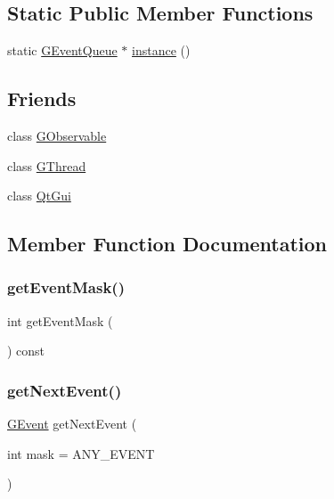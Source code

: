 \subsection*{Static Public Member Functions}
\begin{DoxyCompactItemize}
\item 
static \mbox{\hyperlink{classGEventQueue}{G\+Event\+Queue}} $\ast$ \mbox{\hyperlink{classGEventQueue_adf1947d6eb871d09ad36aa8da73d4d0b}{instance}} ()
\end{DoxyCompactItemize}
\subsection*{Friends}
\begin{DoxyCompactItemize}
\item 
class \mbox{\hyperlink{classGEventQueue_ab2c4a87c15be41d9bef82e78272b6a70}{G\+Observable}}
\item 
class \mbox{\hyperlink{classGEventQueue_a9dc696fcc1fa950eff5e1b92f8f61e3f}{G\+Thread}}
\item 
class \mbox{\hyperlink{classGEventQueue_a78e6068a40352424a09cd3753706c619}{Qt\+Gui}}
\end{DoxyCompactItemize}


\subsection{Member Function Documentation}
\mbox{\label{classGEventQueue_a79a9b73923bc67a3e403fab69fc10353}} 
\subsubsection{\texorpdfstring{get\+Event\+Mask()}{getEventMask()}}
{\footnotesize\ttfamily int get\+Event\+Mask (\begin{DoxyParamCaption}{ }\end{DoxyParamCaption}) const}

\mbox{\label{classGEventQueue_a2cc1dab98b5712012e365c8afdc04bc4}} 
\subsubsection{\texorpdfstring{get\+Next\+Event()}{getNextEvent()}}
{\footnotesize\ttfamily \mbox{\hyperlink{classGEvent}{G\+Event}} get\+Next\+Event (\begin{DoxyParamCaption}\item[{int}]{mask = {\ttfamily ANY\+\_\+EVENT} }\end{DoxyParamCaption})}

